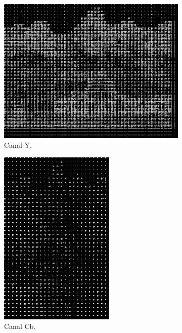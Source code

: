 \documentclass[a4paper, 12pt]{article}
\begin{document}
        \begin{figure}[H]
            \begin{subfigure}{0.3\textwidth}
                \centering
                \includegraphics[width=\linewidth]{resources/Quantization/YQuantization75.png}
                \caption{ Canal Y.}
            \end{subfigure}
            \hfill
            \begin{subfigure}{0.3\textwidth}
                \centering 
                \includegraphics[scale=0.5]{resources/Quantization/CBQuantization75.png}
                \caption{ Canal Cb.}
            \end{subfigure}
            \hfill
            \begin{subfigure}{0.3\textwidth}
                \centering

\end{subfigure}
\end{figure}
\end{document}
